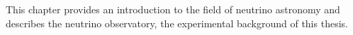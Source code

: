 This chapter provides
  an introduction to the field of neutrino astronomy
  and describes the \icecube neutrino observatory,
    the experimental background of this thesis.
